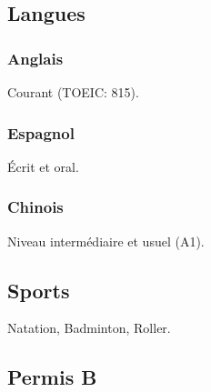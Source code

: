 \documentclass{article}
\begin{document}
\begin{multicols}{2}
            \subsection{Langues}
                \subsubsection{Anglais}
                    Courant (TOEIC: 815).
                \subsubsection{Espagnol}
                    \'Ecrit et oral.
                \subsubsection{Chinois}
                    Niveau interm\'ediaire et usuel (A1).
                \subsection{Sports}
                    Natation, Badminton, Roller.
                \subsection{Permis B}
    \end{multicols}
\end{document}
